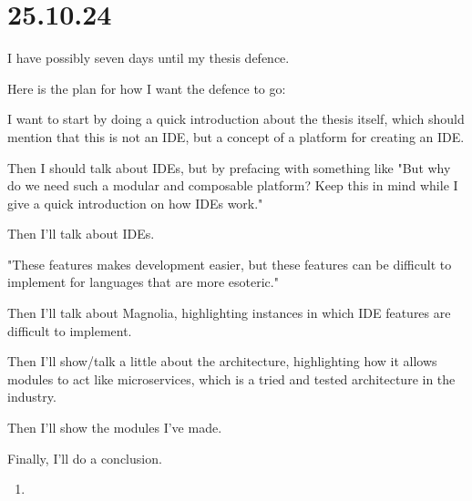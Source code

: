 \section{25.10.24}

I have possibly seven days until my thesis defence.

Here is the plan for how I want the defence to go:

I want to start by doing a quick introduction about the thesis itself, which
should mention that this is not an IDE, but a concept of a platform for creating
an IDE.

Then I should talk about IDEs, but by prefacing with something like "But why do
we need such a modular and composable platform? Keep this in mind while I give a
quick introduction on how IDEs work."

Then I'll talk about IDEs.

"These features makes development easier, but these features can be difficult to
implement for languages that are more esoteric."

Then I'll talk about Magnolia, highlighting instances in which IDE features are
difficult to implement.

Then I'll show/talk a little about the architecture, highlighting how it allows
modules to act like microservices, which is a tried and tested architecture in
the industry.

Then I'll show the modules I've made.

Finally, I'll do a conclusion.

\begin{enumerate}
  \item 
\end{enumerate}